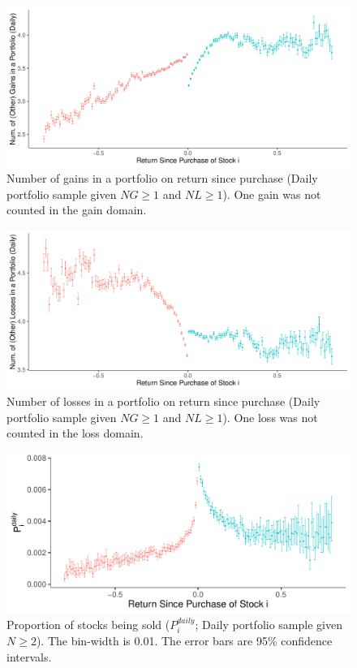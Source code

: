 \documentclass[11pt, a4paper]{article}
\begin{document}
\begin{appendices}
\begin{figure}[H]
	\centering
	\includegraphics[width=0.8\columnwidth]{barc_NG_daily_NG1_NL1_3.pdf}
	\caption{\small Number of gains in a portfolio on return since purchase (Daily portfolio sample given $NG\geq1$ and $NL\geq1$). One gain was not counted in the gain domain.}
	\label{figure:NG_on_return_ng1_nl1}
\end{figure}

\begin{figure}[H]
	\centering
	\includegraphics[width=0.8\columnwidth]{barc_NL_daily_NG1_NL1_3.pdf}
	\caption{\small Number of losses in a portfolio on return since purchase (Daily portfolio sample given $NG\geq1$ and $NL\geq1$). One loss was not counted in the loss domain.}
	\label{figure:NL_on_return_ng1_nl1}
\end{figure}


\begin{figure}[H]
	\centering
	\includegraphics[width=0.8\columnwidth]{barc_schedule_daily_N2_3.pdf}
	\caption{Proportion of stocks being sold ($P^{daily}_{i}$; Daily portfolio sample given $N\geq2$). The bin-width is 0.01. The error bars are 95\% confidence intervals.}
	\label{figure:prop_n2}
\end{figure}


\end{appendices}
\end{document}
